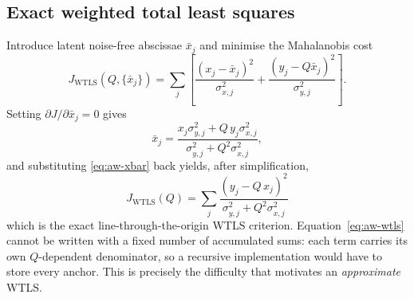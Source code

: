 \subsection{Exact weighted total least squares}
Introduce latent noise-free abscissae $\bar x_j$ and minimise the Mahalanobis cost
\begin{equation}
J_\text{WTLS}(Q,\{\bar x_j\})=\sum_j\left[\frac{(x_j-\bar x_j)^2}{\sigma_{x,j}^2}+\frac{(y_j-Q\bar x_j)^2}{\sigma_{y,j}^2}\right].
\label{eq:aw-wtls0}
\end{equation}
Setting $\partial J/\partial\bar x_j=0$ gives
\begin{equation}
\bar x_j=\frac{x_j\sigma_{y,j}^2+Q\,y_j\sigma_{x,j}^2}{\sigma_{y,j}^2+Q^2\sigma_{x,j}^2},
\label{eq:aw-xbar}
\end{equation}
and substituting \eqref{eq:aw-xbar} back yields, after simplification,
\begin{equation}
\boxed{\;J_\text{WTLS}(Q)=\sum_j\frac{\left(y_j-Q\,x_j\right)^2}{\sigma_{y,j}^2+Q^2\sigma_{x,j}^2}\;}
\label{eq:aw-wtls}
\end{equation}
which is the exact line-through-the-origin WTLS criterion.  Equation~\eqref{eq:aw-wtls} cannot be
written with a fixed number of accumulated sums: each term carries its own $Q$-dependent
denominator, so a recursive implementation would have to store every anchor.  This is precisely the
difficulty that motivates an \emph{approximate} WTLS.

